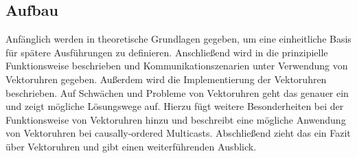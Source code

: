 \subsection{Aufbau}
Anfänglich werden in  theoretische Grundlagen gegeben, um eine einheitliche Basis für spätere Ausführungen zu definieren.
Anschließend wird in  die prinzipielle Funktionsweise beschrieben und Kommunikationszenarien unter Verwendung von Vektoruhren gegeben. 
Außerdem wird die Implementierung der Vektoruhren beschrieben.
Auf Schwächen und Probleme von Vektoruhren geht das  genauer ein und zeigt mögliche Lösungswege auf.
Hierzu fügt  weitere Besonderheiten bei der Funktionsweise von Vektoruhren hinzu und beschreibt eine mögliche Anwendung von Vektoruhren bei causally-ordered Multicasts.
Abschließend zieht das  ein Fazit über Vektoruhren und gibt einen weiterführenden Ausblick.
    
  
